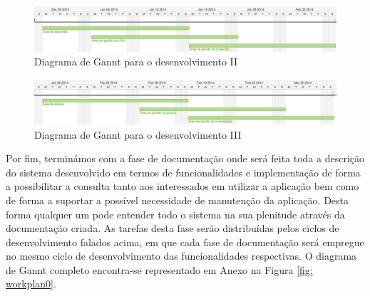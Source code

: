 \begin{figure}[htbp!] 
	\centering
	\includegraphics[width=1\textwidth]{images/plano_de_trabalho/gannt_3.png}
 	\caption{Diagrama de Gannt para o desenvolvimento II}
 	\label{fig: workplan3}
\end{figure}

\begin{figure}[htbp!] 
	\centering
	\includegraphics[width=1\textwidth]{images/plano_de_trabalho/gannt_4.png}
 	\caption{Diagrama de Gannt para o desenvolvimento III}
 	\label{fig: workplan4}
\end{figure}

Por fim, terminámos com a fase de documentação onde será feita toda a descrição 
do sistema desenvolvido em termos de funcionalidades e implementação de forma a 
possibilitar a consulta tanto aos interessados em utilizar a aplicação bem como 
de forma a suportar a possível necessidade de manutenção da aplicação. Desta 
forma qualquer um pode entender todo o sistema na sua plenitude através da 
documentação criada. As tarefas desta fase serão distribuídas pelos ciclos de 
desenvolvimento falados acima, em que cada fase de documentação será empregue no 
mesmo ciclo de desenvolvimento das funcionalidades respectivas.
O diagrama de Gannt completo encontra-se representado em Anexo na Figura \ref{fig: 
workplan0}.

